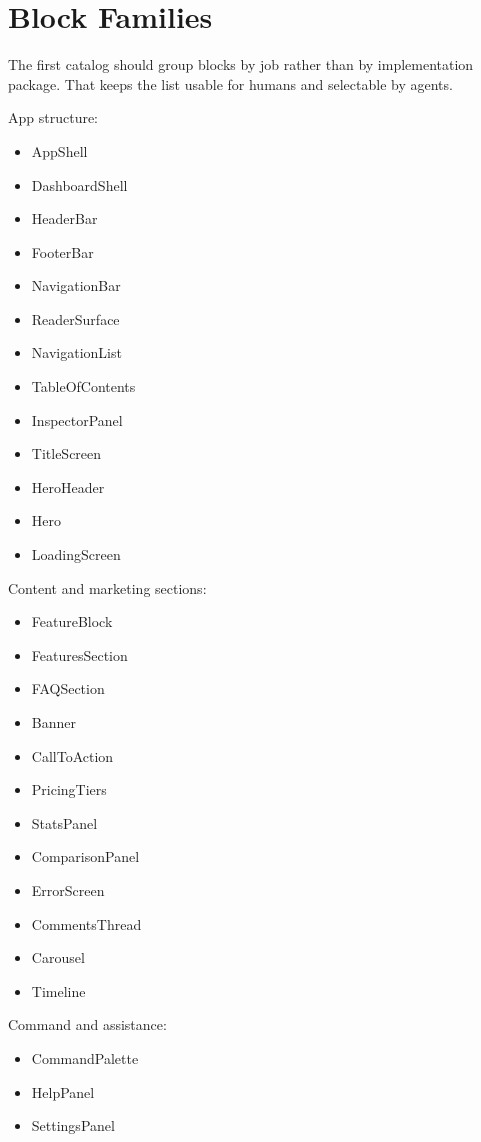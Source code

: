 \section{Block Families}\label{record-128-block-families}

The first catalog should group blocks by job rather than by implementation package. That keeps the list usable for humans and selectable by agents.

App structure:

\begin{itemize}
\tightlist
\item
  AppShell
\item
  DashboardShell
\item
  HeaderBar
\item
  FooterBar
\item
  NavigationBar
\item
  ReaderSurface
\item
  NavigationList
\item
  TableOfContents
\item
  InspectorPanel
\item
  TitleScreen
\item
  HeroHeader
\item
  Hero
\item
  LoadingScreen
\end{itemize}

Content and marketing sections:

\begin{itemize}
\tightlist
\item
  FeatureBlock
\item
  FeaturesSection
\item
  FAQSection
\item
  Banner
\item
  CallToAction
\item
  PricingTiers
\item
  StatsPanel
\item
  ComparisonPanel
\item
  ErrorScreen
\item
  CommentsThread
\item
  Carousel
\item
  Timeline
\end{itemize}

Command and assistance:

\begin{itemize}
\tightlist
\item
  CommandPalette
\item
  HelpPanel
\item
  SettingsPanel
\end{itemize}

